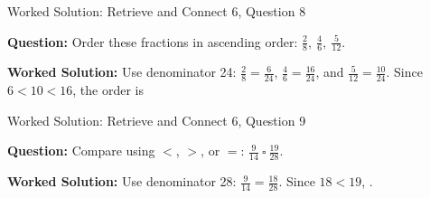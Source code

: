 \documentclass{beamer}
\newcommand{\ashow}[1]{\uncover<2->{\textcolor{red}{\small #1}}}
\begin{document}
\begin{frame}{Worked Solution: Retrieve and Connect 6, Question 8}

\textbf{Question:} Order these fractions in ascending order: $\frac{2}{8},\ \frac{4}{6},\ \frac{5}{12}$.

\textbf{Worked Solution:} Use denominator 24: $\frac28 = \frac{6}{24}$, $\frac46 = \frac{16}{24}$, and $\frac{5}{12} = \frac{10}{24}$. Since $6 < 10 < 16$, the order is \ashow{$\frac{2}{8},\ \frac{5}{12},\ \frac{4}{6}$.}
\end{frame}

\begin{frame}{Worked Solution: Retrieve and Connect 6, Question 9}

\textbf{Question:} Compare using $<$, $>$, or $=$: $\frac{9}{14}\ \square\ \frac{19}{28}$.

\textbf{Worked Solution:} Use denominator 28: $\frac{9}{14} = \frac{18}{28}$. Since $18 < 19$, \ashow{$<$}.
\end{frame}
\end{document}
